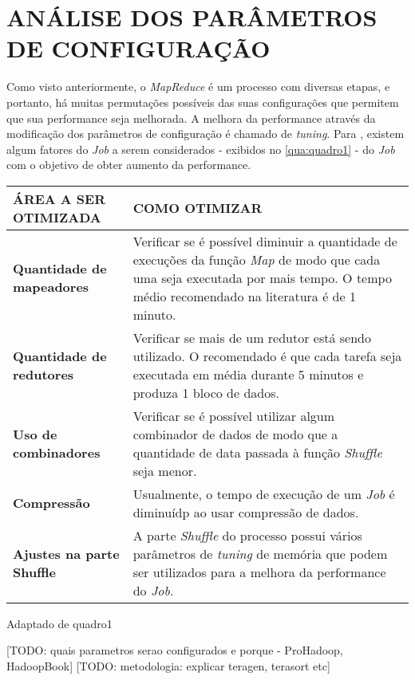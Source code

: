\chapter{ANÁLISE DOS PARÂMETROS DE CONFIGURAÇÃO} \label{cha:analiseparamconfig}

Como visto anteriormente, o \textit{MapReduce} é um processo com diversas etapas, e portanto, há muitas permutações possíveis das suas configurações que permitem que sua performance seja melhorada. A melhora da performance através da modificação dos parâmetros de configuração é chamado de \textit{tuning}. Para \textcite{HadoopBook15}, existem algum fatores do \textit{Job} a serem considerados - exibidos no \autoref{qua:quadro1} - do \textit{Job} com o objetivo de obter aumento da performance.

{\footnotesize
  \centering
  \begin{tabular}{|p{50mm}|p{100mm}|}\hline
    \textbf{ÁREA A SER OTIMIZADA} & \textbf{COMO OTIMIZAR} \\\hline
    \textbf{Quantidade de mapeadores} & Verificar se é possível diminuir a quantidade de execuções da função \textit{Map} de modo que cada uma seja executada por mais tempo. O tempo médio recomendado na literatura é de 1 minuto.  \\\hline
    \textbf{Quantidade de redutores} & Verificar se mais de um redutor está sendo utilizado. O recomendado é que cada tarefa seja executada em média durante 5 minutos e produza 1 bloco de dados.  \\\hline
    \textbf{Uso de combinadores} & Verificar se é possível utilizar algum combinador de dados de modo que a quantidade de data passada à função \textit{Shuffle} seja menor.  \\\hline
    \textbf{Compressão} & Usualmente, o tempo de execução de um \textit{Job} é diminuídp ao usar compressão de dados. \\\hline
    \textbf{Ajustes na parte Shuffle} & A parte \textit{Shuffle} do processo possui vários parâmetros de \textit{tuning} de memória que podem ser utilizados para a melhora da performance do \textit{Job}. \\\hline
\end{tabular}}
{Adaptado de \cite{HadoopBook15}}{quadro1}{}{}

[TODO: quais parametros serao configurados e porque - ProHadoop, HadoopBook]
[TODO: metodologia: explicar teragen, terasort etc]
